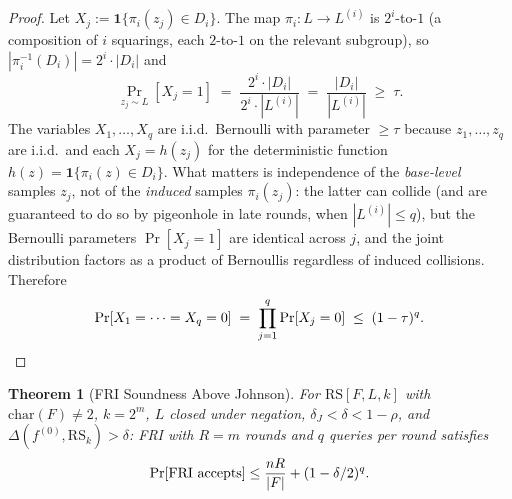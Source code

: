 \documentclass[11pt]{article}
\newtheorem{theorem}{Theorem}
\newcommand{\RS}{\mathrm{RS}}
\begin{document}
\begin{proof}
Let $X_j := \mathbf{1}\{\pi_i(z_j) \in D_i\}$. The map $\pi_i: L \to L^{(i)}$ is $2^i$-to-$1$ (a composition of $i$ squarings, each $2$-to-$1$ on the relevant subgroup), so $|\pi_i^{-1}(D_i)| = 2^i \cdot |D_i|$ and
$$\Pr_{z_j {\sim} L}[X_j = 1] \;=\; \frac{2^i \cdot |D_i|}{2^i \cdot |L^{(i)}|} \;=\; \frac{|D_i|}{|L^{(i)}|} \;\geq\; \tau.$$
The variables $X_1, \ldots, X_q$ are i.i.d.\ Bernoulli with parameter $\geq \tau$ because $z_1, \ldots, z_q$ are i.i.d.\ and each $X_j = h(z_j)$ for the deterministic function $h(z) = \mathbf{1}\{\pi_i(z) \in D_i\}$.  What matters is independence of the \emph{base-level} samples $z_j$, not of the \emph{induced} samples $\pi_i(z_j)$: the latter can collide (and are guaranteed to do so by pigeonhole in late rounds, when $|L^{(i)}| \leq q$), but the Bernoulli parameters $\Pr[X_j = 1]$ are identical across $j$, and the joint distribution factors as a product of Bernoullis regardless of induced collisions. Therefore
$$\Pr[X_1 = \cdots = X_q = 0] \;=\; \prod_{j=1}^q \Pr[X_j = 0] \;\leq\; (1 - \tau)^q. \qedhere$$
\end{proof}

\begin{theorem}[FRI Soundness Above Johnson]
\label{thm:fri-full}
For $\RS[F, L, k]$ with $\mathrm{char}(F) \neq 2$, $k = 2^m$, $L$ closed under negation, $\delta_J < \delta < 1{-}\rho$, and $\Delta(f^{(0)}, \RS_k) > \delta$: FRI with $R = m$ rounds and $q$ queries per round satisfies
$$\Pr[\textup{FRI accepts}] \leq \frac{nR}{|F|} + (1 - \delta/2)^q.$$
\end{theorem}
\end{document}
